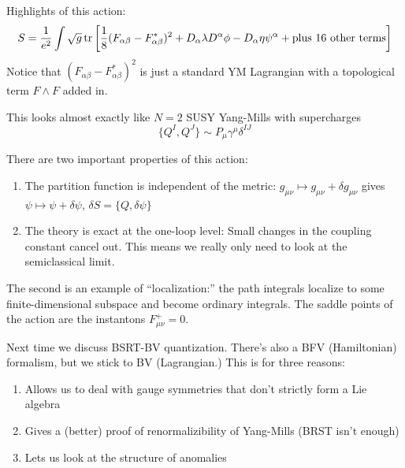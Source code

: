 Highlights of this action:
\[
S = \frac{1}{e^2} \int \sqrt g \operatorname{tr} \left [ \frac{1}{8} (F_{\alpha \beta} - F_{\alpha \beta}^*)^2 + D_\alpha \lambda D^\alpha \phi - D_\alpha \eta \psi^\alpha + \text{plus 16 other terms}\right]
\]
Notice that $(F_{\alpha \beta} - F_{\alpha \beta}^*)^2$ is just a standard YM Lagrangian with a topological term $F\wedge F$ added in.

This looks almost exactly like $N = 2$ SUSY Yang-Mills with supercharges
\[
\{Q^I, Q^J\} \sim P_\mu \gamma^\mu \delta^{IJ}
\]

There are two important properties of this action:
\begin{enumerate}
    \item The partition function is independent of the metric: $g_{\mu \nu} \mapsto g_{\mu \nu} + \delta g_{\mu \nu}$ gives $\psi \mapsto \psi + \delta \psi$, $\delta S = \{Q, \delta \psi\}$
    \item The theory is exact at the one-loop level: Small changes in the coupling constant cancel out.
    This means we really only need to look at the semiclassical limit.
\end{enumerate}
The second is an example of ``localization:'' the path integrals localize to some finite-dimensional subspace and become ordinary integrals.
The saddle points of the action are the instantons $F_{\mu \nu}^+ = 0$.

Next time we discuss BSRT-BV quantization.
There's also a BFV (Hamiltonian) formalism, but we stick to BV (Lagrangian.)
This is for three reasons:
\begin{enumerate}
    \item Allows us to deal with gauge symmetries that don't strictly form a Lie algebra
    \item Gives a (better) proof of renormalizibility of Yang-Mills (BRST isn't enough)
    \item Lets us look at the structure of anomalies
\end{enumerate}